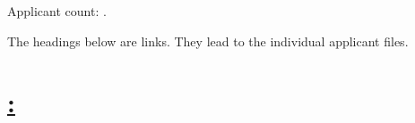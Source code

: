 \documentclass[a4paper]{article}
\begin{document}
  Applicant count: .

  The headings below are links. They lead to the individual applicant files.

    \section*{
      \href{\VAR{file.webViewLink}}{
        : 
      }
    }
\end{document}

